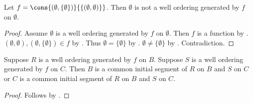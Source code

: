 \begin{proposition}\label{test_nonfunction_not_generated_empty_order}
    Let $f=\cons{(\emptyset,\{\emptyset\})}
        {\{(\emptyset,\emptyset)\}}$.
    Then $\emptyset$ is not a well ordering generated by $f$ on $\emptyset$.
\end{proposition}
\begin{proof}
    Assume $\emptyset$ is a well ordering generated by $f$ on $\emptyset$.
    Then $f$ is a function by .
    $(\emptyset,\emptyset),(\emptyset,\{\emptyset\})\in f$
        by .
    Thus $\emptyset=\{\emptyset\}$ by .
    $\emptyset\neq\{\emptyset\}$ by .
    Contradiction.
\end{proof}

\begin{proposition}\label{test_generated_well_order_compatibility}
    Suppose $R$ is a well ordering generated by $f$ on $B$.
    Suppose $S$ is a well ordering generated by $f$ on $C$.
    Then $B$ is a common initial segment of $R$ on $B$ and $S$ on $C$
    or $C$ is a common initial segment of $R$ on $B$ and $S$ on $C$.
\end{proposition}
\begin{proof}
    Follows by .
\end{proof}
